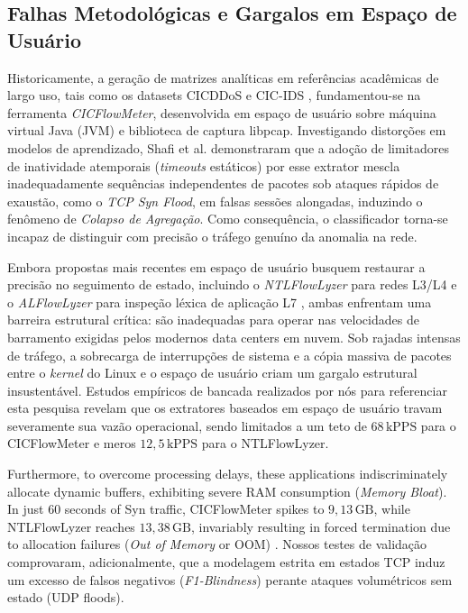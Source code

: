 \documentclass[conference]{IEEEtran}
\begin{document}
\subsection{Falhas Metodológicas e Gargalos em Espaço de Usuário}
Historicamente, a geração de matrizes analíticas em referências acadêmicas de largo uso, tais como os datasets CICDDoS \cite{sharafaldin_ddos_2019} e CIC-IDS \cite{sharafaldin_ids_2018}, fundamentou-se na ferramenta \textit{CICFlowMeter}, desenvolvida em espaço de usuário sobre máquina virtual Java (JVM) e biblioteca de captura libpcap. Investigando distorções em modelos de aprendizado, Shafi et al. \cite{shafi_ntlflowlyzer_2025} demonstraram que a adoção de limitadores de inatividade atemporais (\textit{timeouts} estáticos) por esse extrator mescla inadequadamente sequências independentes de pacotes sob ataques rápidos de exaustão, como o \textit{TCP Syn Flood}, em falsas sessões alongadas, induzindo o fenômeno de \textit{Colapso de Agregação}. Como consequência, o classificador torna-se incapaz de distinguir com precisão o tráfego genuíno da anomalia na rede.

Embora propostas mais recentes em espaço de usuário busquem restaurar a precisão no seguimento de estado, incluindo o \textit{NTLFlowLyzer} para redes L3/L4 \cite{shafi_ntlflowlyzer_2025} e o \textit{ALFlowLyzer} para inspeção léxica de aplicação L7 \cite{shafi_unveiling_2024}, ambas enfrentam uma barreira estrutural crítica: são inadequadas para operar nas velocidades de barramento exigidas pelos modernos data centers em nuvem. Sob rajadas intensas de tráfego, a sobrecarga de interrupções de sistema e a cópia massiva de pacotes entre o \textit{kernel} do Linux e o espaço de usuário criam um gargalo estrutural insustentável. Estudos empíricos de bancada realizados por nós para referenciar esta pesquisa revelam que os extratores baseados em espaço de usuário travam severamente sua vazão operacional, sendo limitados a um teto de $68\,\text{kPPS}$ para o CICFlowMeter e meros $12,5\,\text{kPPS}$ para o NTLFlowLyzer.

Furthermore, to overcome processing delays, these applications indiscriminately allocate dynamic buffers, exhibiting severe RAM consumption (\textit{Memory Bloat}). In just 60 seconds of Syn traffic, CICFlowMeter spikes to $9,13\,\text{GB}$, while NTLFlowLyzer reaches $13,38\,\text{GB}$, invariably resulting in forced termination due to allocation failures (\textit{Out of Memory} or OOM) \cite{shafi_ntlflowlyzer_2025}. Nossos testes de validação comprovaram, adicionalmente, que a modelagem estrita em estados TCP induz um excesso de falsos negativos (\textit{F1-Blindness}) perante ataques volumétricos sem estado (UDP floods).
\end{document}
